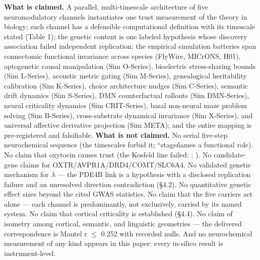 \documentclass[11pt,twocolumn]{article}
\theoremstyle{plain}
\begin{document}
\textbf{What is claimed.} A parallel, multi-timescale architecture of five neuromodulatory channels instantiates one trust measurement of the theory in biology; each channel has a defensible computational definition with its timescale stated (Table 1); the genetic content is one labeled hypothesis whose discovery association failed independent replication; the empirical simulation batteries span connectomic functional invariance across species (FlyWire, MICrONS, H01), optogenetic causal manipulation (Sim O-Series), bioelectric stress-sharing bounds (Sim L-Series), acoustic metric gating (Sim M-Series), genealogical heritability calibration (Sim K-Series), choice architecture nudges (Sim C-Series), semantic drift dynamics (Sim S-Series), DMN counterfactual rollouts (Sim DMN-Series), neural criticality dynamics (Sim CRIT-Series), basal non-neural maze problem solving (Sim B-Series), cross-substrate dynamical invariance (Sim X-Series), and universal affective derivative projection (Sim META); and the entire mapping is pre-registered and falsifiable. \textbf{What is not claimed.} No serial five-step neurochemical sequence (the timescales forbid it; ``stage\'\' names a functional role). No claim that oxytocin causes trust (the Kosfeld line failed: \citealp{nave2015}; \citealp{declerck2020}). No candidate-gene claims for OXTR/AVPR1A/DRD4/COMT/SLC6A4. No validated genetic mechanism for $\lambda$ — the PDE4B link is a hypothesis with a disclosed replication failure and an unresolved direction contradiction (\S{}4.2). No quantitative genetic effect sizes beyond the cited GWAS statistics. No claim that the five carriers act alone — each channel is predominantly, not exclusively, carried by its named system. No claim that cortical criticality is established (\S{}4.4). No claim of isometry among cortical, semantic, and linguistic geometries — the delivered correspondence is Mantel r $\leq$ 0.252 with recorded nulls. And no neurochemical measurement of any kind appears in this paper: every in-silico result is instrument-level.
\end{document}
